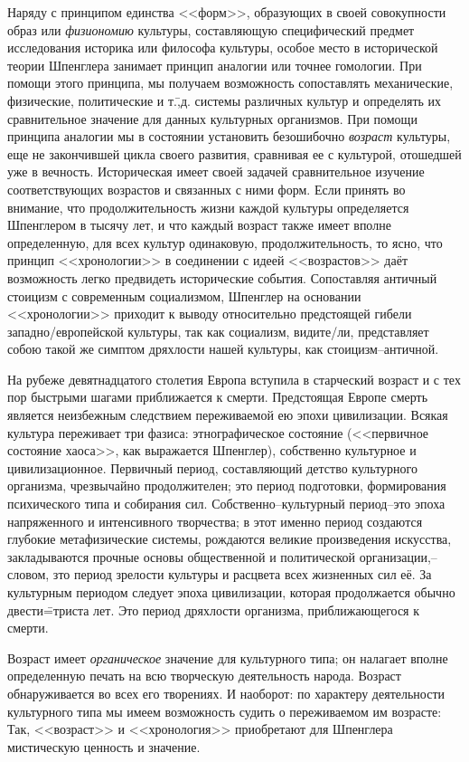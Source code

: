 Наряду с принципом единства <<форм>>, образующих в своей совокупности образ или \emph{физиономию} культуры, составляющую специфический предмет исследования историка или философа культуры, особое место в исторической теории Шпенглера занимает принцип аналогии или точнее гомологии. При помощи этого принципа, мы получаем возможность сопоставлять механические, физические, политические и т.\=,д. системы различных культур и определять их сравнительное значение для данных культурных организмов. При помощи принципа аналогии мы в состоянии установить безошибочно \emph{возраст} культуры, еще не закончившей цикла своего развития, сравнивая ее с культурой, отошедшей уже в вечность. Историческая имеет своей задачей сравнительное изучение соответствующих возрастов и связанных с ними форм. Если принять во внимание, что продолжительность жизни каждой культуры определяется Шпенглером в тысячу лет, и что каждый возраст также имеет вполне определенную, для всех культур одинаковую, продолжительность, то ясно, что принцип <<хронологии>> в соединении с идеей <<возрастов>> даёт возможность легко предвидеть исторические события. Сопоставляя античный стоицизм с современным социализмом, Шпенглер на основании <<хронологии>> приходит к выводу относительно предстоящей гибели западно\-/европейской культуры, так как социализм, видите\-/ли, представляет собою такой же симптом дряхлости нашей культуры, как стоицизм\---античной.

На рубеже девятнадцатого столетия Европа вступила в старческий возраст и с тех пор быстрыми шагами приближается к смерти. Предстоящая Европе смерть является неизбежным следствием переживаемой ею эпохи цивилизации. Всякая культура переживает три фазиса: этнографическое состояние (<<первичное состояние хаоса>>, как выражается Шпенглер), собственно культурное и цивилизационное. Первичный период, составляющий детство культурного организма, чрезвычайно продолжителен; это период подготовки, формирования психического типа и собирания сил. Собственно\---культурный период\---это эпоха напряженного и интенсивного творчества; в этот именно период создаются глубокие метафизические системы, рождаются великие произведения искусства, закладываются прочные основы общественной и политической организации,\---словом, зто период зрелости культуры и расцвета всех жизненных сил её. За культурным периодом следует эпоха цивилизации, которая продолжается обычно двести\==триста лет. Это период дряхлости организма, приближающегося к смерти.

Возраст имеет \emph{органическое} значение для культурного типа; он налагает вполне определенную печать на всю творческую деятельность народа. Возраст обнаруживается во всех его творениях. И наоборот: по характеру деятельности культурного типа мы имеем возможность судить о переживаемом им возрасте: Так, <<возраст>> и <<хронология>> приобретают для Шпенглера мистическую ценность и значение.

